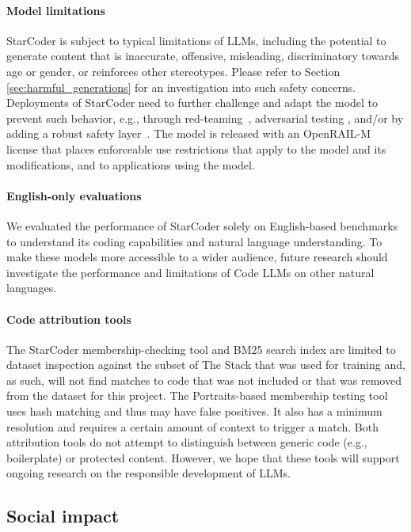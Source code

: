 \paragraph{Model limitations} StarCoder is subject to typical limitations of LLMs, including the potential to generate  content that is inaccurate, offensive, misleading, discriminatory towards age or gender, or reinforces other stereotypes. Please refer to Section \ref{sec:harmful_generations} for an investigation into such safety concerns. Deployments of StarCoder need to further challenge and adapt the model to prevent such behavior, e.g., through red-teaming~\citep{perez2022red}, adversarial testing \citep{wan2023poisoning}, and/or by adding a robust safety layer~\citep{openai2023systemcard}. The model is released with an OpenRAIL-M license that places enforceable use restrictions that apply to the model and its modifications, and to applications using the model. 

\paragraph{English-only evaluations} We evaluated the performance of StarCoder solely on English-based benchmarks to understand its coding capabilities and natural language understanding. To make these models more accessible to a wider audience, future research should investigate the performance and limitations of Code LLMs on other natural languages. 

\paragraph{Code attribution tools} The StarCoder membership-checking tool and BM25 search index are limited to dataset inspection against the subset of The Stack that was used for training and, as such, will not find matches to code that was not included or that was removed from the dataset for this project. The Portraits-based membership testing tool uses hash matching and thus may have false positives. It also has a minimum resolution and requires a certain amount of context to trigger a match. Both attribution tools do not attempt to distinguish between generic code (e.g., boilerplate) or protected content. However, we hope that these tools will support ongoing research on the responsible development of LLMs.

\subsection{Social impact}

